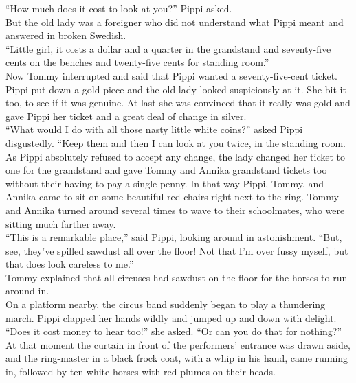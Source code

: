 \documentclass{standard}
\begin{document}
“How much does it cost to look at you?” Pippi asked.\\

But the old lady was a foreigner who did not understand what Pippi meant and answered in broken Swedish.\\

“Little girl, it costs a dollar and a quarter in the grandstand and seventy-five cents on the benches and twenty-five cents for standing room.”\\

Now Tommy interrupted and said that Pippi wanted a seventy-five-cent ticket. Pippi put down a gold piece and the old lady looked suspiciously at it. She bit it too, to see if it was genuine. At last she was convinced that it really was gold and gave Pippi her ticket and a great deal of change in silver.\\

“What would I do with all those nasty little white coins?” asked Pippi disgustedly. “Keep them and then I can look at you twice, in the standing room.\\

As Pippi absolutely refused to accept any change, the lady changed her ticket to one for the grandstand and gave Tommy and Annika grandstand tickets too without their having to pay a single penny. In that way Pippi, Tommy, and Annika came to sit on some beautiful red chairs right next to the ring. Tommy and Annika turned around several times to wave to their schoolmates, who were sitting much farther away.\\

“This is a remarkable place,” said Pippi, looking around in astonishment. “But, see, they’ve spilled sawdust all over the floor! Not that I’m over fussy myself, but that does look careless to me.”\\

Tommy explained that all circuses had sawdust on the floor for the horses to run around in.\\

On a platform nearby, the circus band suddenly began to play a thundering march. Pippi clapped her hands wildly and jumped up and down with delight. “Does it cost money to hear too!” she asked. “Or can you do that for nothing?”\\

At that moment the curtain in front of the performers’ entrance was drawn aside, and the ring-master in a black frock coat, with a whip in his hand, came running in, followed by ten white horses with red plumes on their heads.\\
\end{document}
